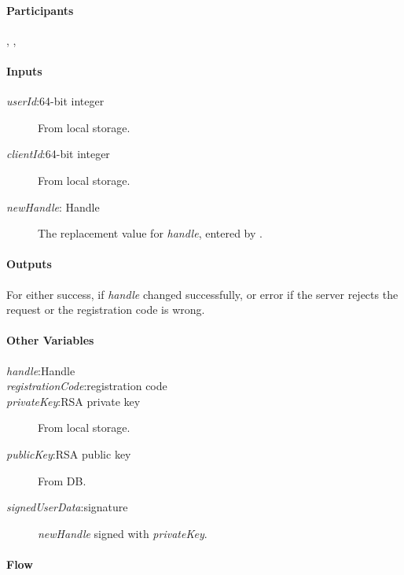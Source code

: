 \documentclass[a4paper,10pt,draft]{article}
\newcommand{\signedUserData}{\emph{signedUserData}}
\newcommand{\handle}{\emph{handle}}
\newcommand{\registrationCode}{\emph{registrationCode}}
\newcommand{\privateKey}{\emph{privateKey}}
\newcommand{\publicKey}{\emph{publicKey}}
\newcommand{\userId}{\emph{userId}}
\newcommand{\clientId}{\emph{clientId}}
\newcommand{\newHandle}{\emph{newHandle}}
\begin{document}
\paragraph{Participants} \Client{}, \Server{}, \User{}

\paragraph{Inputs}
\SpecialItem
\begin{description}
 \item[\userId{}:64-bit integer] From \Client{} local storage.
 \item[\clientId{}:64-bit integer] From \Client{} local storage.
 \item[\newHandle{}: Handle] The replacement value for \handle{}, entered by
\User{}.
\end{description}

\paragraph{Outputs}
For \Client{} either success, if \handle{} changed successfully, or error 
if the server rejects the request or the registration code is wrong.

\paragraph{Other Variables}
\SpecialItem
\begin{description}
 \item[\handle{}:Handle]
 \item[\registrationCode{}:registration code]
 \item[\privateKey{}:RSA private key] From \Client{} local storage.
 \item[\publicKey{}:RSA public key] From \Server{} DB.
 \item[\signedUserData{}:signature] \newHandle{} signed with \privateKey{}.
\end{description}

\paragraph{Flow}
\end{document}
